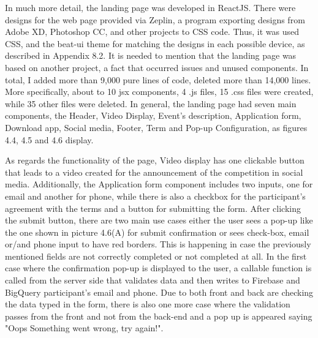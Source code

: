 In much more detail, the landing page was developed in ReactJS. There were designs for the web page provided via Zeplin, a program exporting designs from Adobe XD, Photoshop CC, and other projects to CSS code. Thus, it was used CSS, and the beat-ui theme for matching the designs in each possible device, as described in Appendix 8.2. It is needed to mention that the landing page was based on another project, a fact that occurred issues and unused components. In total, I added more than 9,000 pure lines of code, deleted more than 14,000 lines. More specifically, about to 10 jsx components, 4 .js files, 15 .css files were created, while 35 other files were deleted. In general, the landing page had seven main components, the Header, Video Display, Event's description, Application form, Download app, Social media, Footer, Term and Pop-up Configuration, as figures 4.4, 4.5 and 4.6 display. \par

As regards the functionality of the page, Video display has one clickable button that leads to a video created for the announcement of the competition in social media. Additionally, the Application form component includes two inputs, one for email and another for phone, while there is also a checkbox for the participant's agreement with the terms and a button for submitting the form. After clicking the submit button, there are two main use cases either the user sees a pop-up like the one shown in picture 4.6(A) for submit confirmation or sees check-box, email or/and phone input to have red borders. This is happening in case the previously mentioned fields are not correctly completed or not completed at all.  In the first case where the confirmation pop-up is displayed to the user, a callable function is called from the server side that validates data and then writes to Firebase and BigQuery participant's email and phone. Due to both front and back are checking the data typed in the form, there is also one more case where the validation passes from the front and not from the back-end and a pop up is appeared saying "Oops Something went wrong, try again!". \par


